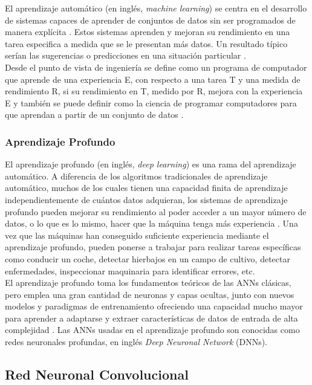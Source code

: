 El aprendizaje automático (en inglés, \textit{machine learning}) se centra en el desarrollo de sistemas capaces de aprender de conjuntos de datos sin ser programados de manera explícita \citep{mitchell1997does}. Estos sistemas aprenden y mejoran su rendimiento en una tarea especifica a medida que se le presentan más datos. Un resultado típico serían las sugerencias o predicciones en una situación particular \citep{vieira2020main}.\\

Desde el punto de vista de ingeniería se define como un programa de computador que aprende de una experiencia E, con respecto a una tarea T y una medida de rendimiento R, si su rendimiento en T, medido por R, mejora con la experiencia E y también se puede definir como la ciencia de programar computadores para que aprendan a partir de un conjunto de datos \citep{geron2020aprende}.

\subsubsection{Aprendizaje Profundo}

El aprendizaje profundo (en inglés, \textit{deep learning}) es una rama del aprendizaje automático. A diferencia de los algoritmos tradicionales de aprendizaje automático, muchos de los cuales tienen una capacidad finita de aprendizaje independientemente de cuántos datos adquieran, los sistemas de aprendizaje profundo pueden mejorar su rendimiento al poder acceder a un mayor número de datos, o lo que es lo mismo, hacer que la máquina tenga más experiencia \citep{shinde2018review}. Una vez que las máquinas han conseguido suficiente experiencia mediante el aprendizaje profundo, pueden ponerse a trabajar para realizar tareas específicas como conducir un coche, detectar hierbajos en un campo de cultivo, detectar enfermedades, inspeccionar maquinaria para identificar errores, etc.\\

El aprendizaje profundo toma los fundamentos teóricos de las ANNs clásicas, pero emplea una gran cantidad de neuronas y capas ocultas, junto con nuevos modelos y paradigmas de entrenamiento ofreciendo una capacidad mucho mayor para aprender a adaptarse y extraer características de datos de entrada de alta complejidad \citep{schmidhuber2015deep}. Las ANNs usadas en el aprendizaje profundo son conocidas como redes neuronales profundas, en inglés \textit{Deep Neuronal Network} (DNNs).

\subsection{Red Neuronal Convolucional}

